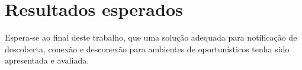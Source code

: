 \chapter{Resultados esperados}\label{chap:resultados-esperados}

Espera-se ao final deste trabalho, que uma solução adequada para notificação de descoberta, conexão e desconexão para ambientes de \iomt{} oportunísticos tenha sido apresentada e avaliada.


